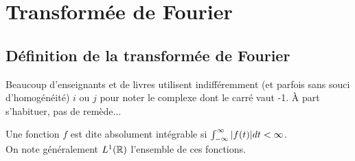 \chapter{Transformée de Fourier}


%





\section{Définition de la transformée de Fourier}

\begin{remark}

Beaucoup d'enseignants et de livres utilisent indifféremment (et
parfois sans souci d'homogénéité) $i$ ou $j$ pour noter le complexe
dont le carré vaut -1. \`A part s'habituer, pas de remède...

\end{remark}

\begin{definition}
Une fonction $f$ est dite absolument intégrable si $\int_{-\infty}^{\infty} |f(t)|dt<\infty$. \\ On note généralement $L^1(\mathbb{R})$ l'ensemble de ces fonctions.


\end{definition}


